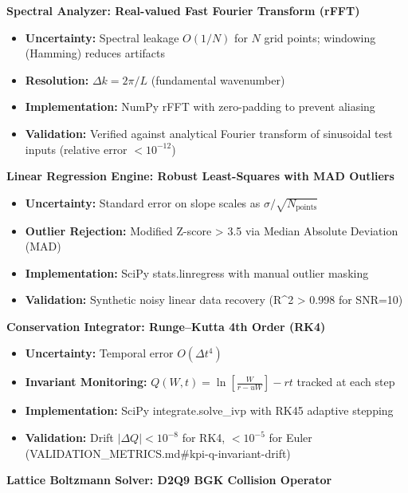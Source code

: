 \documentclass[
]{article}
\providecommand{\tightlist}{%
  \setlength{\itemsep}{0pt}\setlength{\parskip}{0pt}}
\begin{document}
\textbf{Spectral Analyzer: Real-valued Fast Fourier Transform (rFFT)}

\begin{itemize}
\tightlist
\item
  \textbf{Uncertainty:} Spectral leakage \(O(1/N)\) for \(N\) grid
  points; windowing (Hamming) reduces artifacts
\item
  \textbf{Resolution:} \(\Delta k = 2\pi/L\) (fundamental wavenumber)
\item
  \textbf{Implementation:} NumPy rFFT with zero-padding to prevent
  aliasing
\item
  \textbf{Validation:} Verified against analytical Fourier transform of
  sinusoidal test inputs (relative error \(< 10^{-12}\))
\end{itemize}

\textbf{Linear Regression Engine: Robust Least-Squares with MAD
Outliers}

\begin{itemize}
\tightlist
\item
  \textbf{Uncertainty:} Standard error on slope scales as
  \(\sigma/\sqrt{N_{\text{points}}}\)
\item
  \textbf{Outlier Rejection:} Modified Z-score \textgreater{} 3.5 via
  Median Absolute Deviation (MAD)
\item
  \textbf{Implementation:} SciPy stats.linregress with manual outlier
  masking
\item
  \textbf{Validation:} Synthetic noisy linear data recovery (R^{2}
  \textgreater{} 0.998 for SNR=10)
\end{itemize}

\textbf{Conservation Integrator: Runge--Kutta 4th Order (RK4)}

\begin{itemize}
\tightlist
\item
  \textbf{Uncertainty:} Temporal error \(O(\Delta t^{4})\)
\item
  \textbf{Invariant Monitoring:}
  \(Q(W,t) = \ln\!\left[\tfrac{W}{r-uW}\right] - r t\) tracked at each
  step
\item
  \textbf{Implementation:} SciPy integrate.solve\_ivp with RK45 adaptive
  stepping
\item
  \textbf{Validation:} Drift \(|\Delta Q| < 10^{-8}\) for RK4,
  \(< 10^{-5}\) for Euler
  (VALIDATION\_METRICS.md\#kpi-q-invariant-drift)
\end{itemize}

\textbf{Lattice Boltzmann Solver: D2Q9 BGK Collision Operator}
\end{document}
